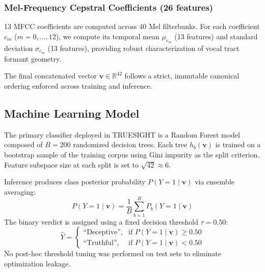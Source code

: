 \documentclass[conference]{IEEEtran}
\begin{document}
\subsubsection{Mel-Frequency Cepstral Coefficients (26 features)}
13 MFCC coefficients are computed across 40 Mel filterbanks. For each coefficient $c_m$ ($m=0, \dots, 12$), we compute its temporal mean $\mu_{c_m}$ (13 features) and standard deviation $\sigma_{c_m}$ (13 features), providing robust characterization of vocal tract formant geometry.

The final concatenated vector $\mathbf{v} \in \mathbb{R}^{42}$ follows a strict, immutable canonical ordering enforced across training and inference.

\subsection{Machine Learning Model}
The primary classifier deployed in TRUESIGHT is a Random Forest model \cite{breiman2001random} composed of $B = 200$ randomized decision trees. Each tree $h_b(\mathbf{v})$ is trained on a bootstrap sample of the training corpus using Gini impurity as the split criterion. Feature subspace size at each split is set to $\sqrt{42} \approx 6$.

Inference produces class posterior probability $P(Y=1 \mid \mathbf{v})$ via ensemble averaging:
\begin{equation}
    P(Y=1 \mid \mathbf{v}) = \frac{1}{B}\sum_{b=1}^B P_b(Y=1 \mid \mathbf{v})
\end{equation}
The binary verdict is assigned using a fixed decision threshold $\tau = 0.50$:
\begin{equation}
    \hat{Y} = \begin{cases}
        \text{``Deceptive''}, & \text{if } P(Y=1 \mid \mathbf{v}) \ge 0.50 \\
        \text{``Truthful''}, & \text{if } P(Y=1 \mid \mathbf{v}) < 0.50
    \end{cases}
\end{equation}
No post-hoc threshold tuning was performed on test sets to eliminate optimization leakage.
\end{document}
